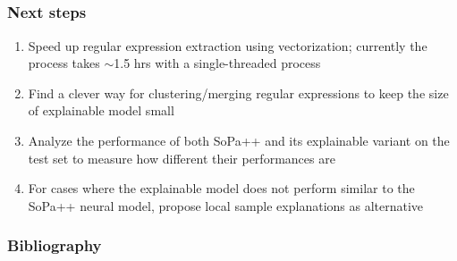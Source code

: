 \documentclass[10pt]{beamer}
\begin{document}
\subsection{}
\begin{frame}
  \frametitle{Next steps}
  \begin{enumerate}
    [square]
    \setlength\itemsep{0.8em}
    \item Speed up regular expression extraction using vectorization; currently the process takes $\sim$1.5 hrs with a single-threaded process
    \item Find a clever way for clustering/merging regular expressions to keep the size of explainable model small
    \item Analyze the performance of both SoPa++ and its explainable variant on the test set to measure how different their performances are
    \item For cases where the explainable model does not perform similar to the SoPa++ neural model, propose local sample explanations as alternative
  \end{enumerate}
\end{frame} 

\begin{frame}[allowframebreaks]
  \frametitle{Bibliography}
  \nocite{*}
  \printbibliography[title = {Bibliography}]
\end{frame}
\end{document}
